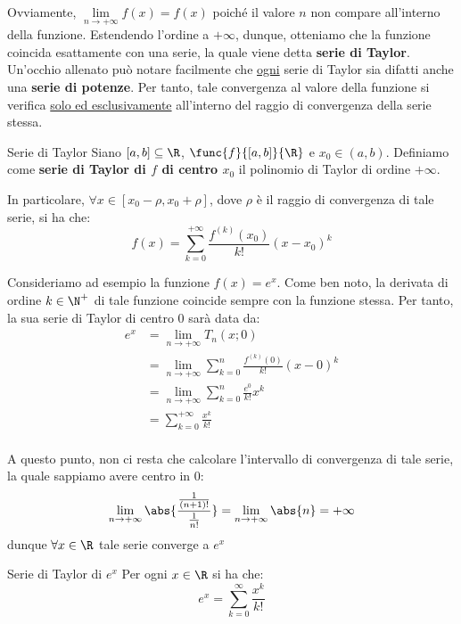 \documentclass[a4paper, 12pt]{report}
\begin{document}
    Ovviamente, $\lim\limits_{n \to +\infty} f(x) = f(x)$ poiché il valore $n$ non compare all'interno della funzione. Estendendo l'ordine a $+\infty$, dunque, otteniamo che la funzione coincida esattamente con una serie, la quale viene detta \textbf{serie di Taylor}. Un'occhio allenato può notare facilmente che \underline{ogni} serie di Taylor sia difatti anche una \textbf{serie di potenze}. Per tanto, tale convergenza al valore della funzione si verifica \underline{solo ed esclusivamente} all'interno del raggio di convergenza della serie stessa.

    \begin{frameddefn}{Serie di Taylor}
        Siano $[a,b] \subseteq \R$, $\func{f}{[a,b]}{\R}$ e $x_0 \in (a,b)$. Definiamo come \textbf{serie di Taylor di $f$ di centro $x_0$} il polinomio di Taylor di ordine $+\infty$.
        
        In particolare, $\forall x \in [x_0-\rho, x_0+\rho]$, dove $\rho$ è il raggio di convergenza di tale serie, si ha che:
        \[f(x) = \sum_{k = 0}^{+\infty} \frac{f^{(k)}(x_0)}{k!} (x-x_0)^{k}\]
    \end{frameddefn}

    Consideriamo ad esempio la funzione $f(x) = e^x$. Come ben noto, la derivata di ordine $k \in \N^+$ di tale funzione coincide sempre con la funzione stessa. Per tanto, la sua serie di Taylor di centro $0$ sarà data da:
    \[\begin{split}
        e^x &= \lim_{n \to +\infty} T_n(x; 0) \\
        &= \lim_{n \to +\infty} \sum_{k = 0}^n \frac{f^{(k)}(0)}{k!} (x-0)^{k} \\
        &= \lim_{n \to +\infty} \sum_{k = 0}^n \frac{e^{0}}{k!} x^{k} \\
        &= \sum_{k = 0}^{+\infty} \frac{x^{k}}{k!} \\
    \end{split}\]

    A questo punto, non ci resta che calcolare l'intervallo di convergenza di tale serie, la quale sappiamo avere centro in $0$:
    \[\lim_{n \to +\infty} \abs{\frac{\frac{1}{(n+1)!}}{\frac{1}{n!}}} = \lim_{n \to +\infty} \abs{n} = +\infty\]
    dunque $\forall x \in \R$ tale serie converge a $e^x$

    \begin{framedprop}{Serie di Taylor di $e^x$}
        Per ogni $x \in \R$ si ha che:
        \[e^x =  \sum_{k=0}^{\infty} \frac{x^k}{k!}\]
    \end{framedprop}
\end{document}

